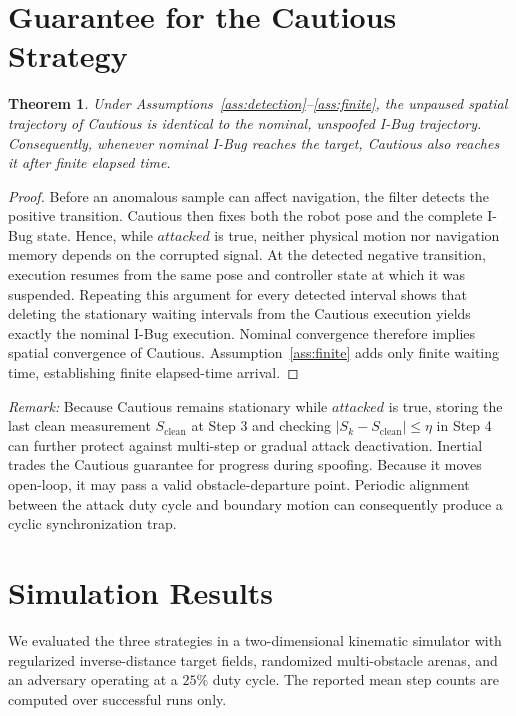\documentclass[10pt,a4paper]{article}
\newtheorem{theorem}{Theorem}
\begin{document}
\section{Guarantee for the Cautious Strategy}
\begin{theorem}
Under Assumptions~\ref{ass:detection}--\ref{ass:finite}, the unpaused spatial trajectory of Cautious is identical to the nominal, unspoofed I-Bug trajectory. Consequently, whenever nominal I-Bug reaches the target, Cautious also reaches it after finite elapsed time.
\label{thm:cautious}
\end{theorem}

\begin{proof}
Before an anomalous sample can affect navigation, the filter detects the positive transition. Cautious then fixes both the robot pose and the complete I-Bug state. Hence, while $attacked$ is true, neither physical motion nor navigation memory depends on the corrupted signal. At the detected negative transition, execution resumes from the same pose and controller state at which it was suspended. Repeating this argument for every detected interval shows that deleting the stationary waiting intervals from the Cautious execution yields exactly the nominal I-Bug execution. Nominal convergence therefore implies spatial convergence of Cautious. Assumption~\ref{ass:finite} adds only finite waiting time, establishing finite elapsed-time arrival.
\end{proof}

\emph{Remark:} Because Cautious remains stationary while $attacked$ is true, storing the last clean measurement $S_{\mathrm{clean}}$ at Step 3 and checking $\vert{}S_k - S_{\mathrm{clean}}\vert{} \le \eta$ in Step 4 can further protect against multi-step or gradual attack deactivation. Inertial trades the Cautious guarantee for progress during spoofing. Because it moves open-loop, it may pass a valid obstacle-departure point. Periodic alignment between the attack duty cycle and boundary motion can consequently produce a cyclic synchronization trap.

\section{Simulation Results}
We evaluated the three strategies in a two-dimensional kinematic simulator with regularized inverse-distance target fields, randomized multi-obstacle arenas, and an adversary operating at a $25\%$ duty cycle. The reported mean step counts are computed over successful runs only.
\end{document}
